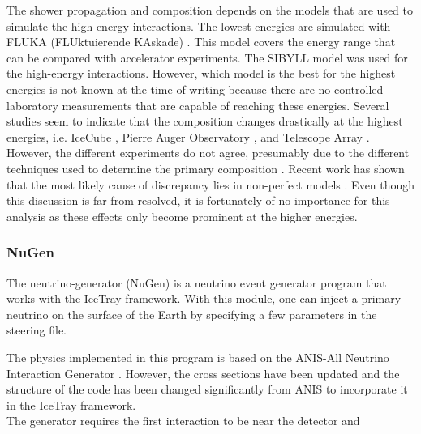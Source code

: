 \noindent The shower propagation and composition depends on the models that are used to simulate the high-energy interactions. The lowest energies are simulated with FLUKA  (FLUktuierende KAskade) \cite{Battistoni:2015epi}. This model covers the energy range that can be compared with accelerator experiments.  The SIBYLL model was used for the high-energy interactions. However, which model is the best for the highest energies is not known at the time of writing because there are no controlled laboratory measurements that are capable of reaching these energies. Several studies seem to indicate that the composition changes drastically at the highest energies, i.e. IceCube \cite{Rawlins:2016bkc}, Pierre Auger Observatory \cite{Porcelli:2015jli}, and Telescope Array \cite{Belz:2015cvi}. However, the different experiments do not agree, presumably due to the different techniques used to determine the primary composition \cite{samDeRidder}. Recent work has shown that the most likely cause of discrepancy lies in non-perfect models \cite{Dembinski:2019uta}. Even though this discussion is far from resolved, it is fortunately of no importance for this analysis as these effects only become prominent at the higher energies.\\

\subsubsection{NuGen}
\label{subsec:nugen}
The neutrino-generator (NuGen) is a neutrino event generator program that works with the IceTray framework. With this module, one can inject a primary neutrino on the surface of the Earth by specifying a few parameters in the steering file.

The physics implemented in this program is based on the ANIS-All Neutrino Interaction Generator \cite{Gazizov:2004va}. However, the cross sections have been updated and the structure of the code has been changed significantly from ANIS to incorporate it in the IceTray framework.\\

\noindent The generator requires the first interaction to be near the detector and

